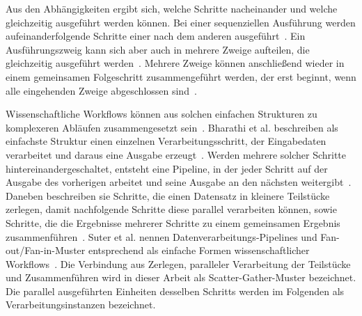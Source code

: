 Aus den Abhängigkeiten ergibt sich, welche Schritte nacheinander und
welche gleichzeitig ausgeführt werden können. Bei einer sequenziellen Ausführung werden aufeinanderfolgende Schritte einer nach dem anderen
ausgeführt~\cite[S.~8]{russell2006patterns}.
Ein Ausführungszweig kann sich aber auch in mehrere Zweige
aufteilen, die gleichzeitig ausgeführt
werden~\cite[S.~9]{russell2006patterns}. Mehrere Zweige können anschließend wieder in einem gemeinsamen Folgeschritt zusammengeführt werden, der erst beginnt, wenn alle eingehenden Zweige abgeschlossen sind~\cite[S.~10]{russell2006patterns}.

Wissenschaftliche Workflows können aus solchen einfachen Strukturen
zu komplexeren Abläufen zusammengesetzt
sein~\cite[S.~2]{bharathi2008characterization}. Bharathi et al.
beschreiben als einfachste Struktur einen einzelnen
Verarbeitungsschritt, der Eingabedaten verarbeitet und daraus eine
Ausgabe erzeugt~\cite[S.~3]{bharathi2008characterization}. Werden mehrere solcher Schritte hintereinandergeschaltet, entsteht eine Pipeline, in der jeder Schritt auf der Ausgabe des vorherigen
arbeitet und seine Ausgabe an den nächsten weitergibt~\cite[S.~3]{bharathi2008characterization}.
Daneben beschreiben sie Schritte, die einen Datensatz in kleinere
Teilstücke zerlegen, damit nachfolgende Schritte diese parallel
verarbeiten können, sowie Schritte, die die Ergebnisse mehrerer
Schritte zu einem gemeinsamen Ergebnis
zusammenführen~\cite[S.~3]{bharathi2008characterization}. Suter et
al. nennen Datenverarbeitungs-Pipelines und Fan-out/Fan-in-Muster
entsprechend als einfache Formen wissenschaftlicher
Workflows~\cite[S.~4]{suter2026terminology}. Die Verbindung aus
Zerlegen, paralleler Verarbeitung der Teilstücke und Zusammenführen
wird in dieser Arbeit als Scatter-Gather-Muster bezeichnet. Die
parallel ausgeführten Einheiten desselben Schritts werden im
Folgenden als Verarbeitungsinstanzen bezeichnet.



